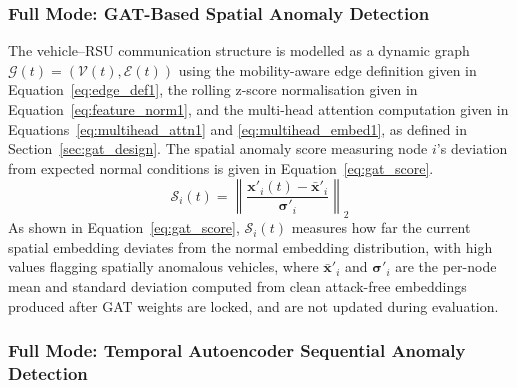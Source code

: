 \documentclass[12pt, a4paper]{report}
\begin{document}
\subsubsection{Full Mode: GAT-Based Spatial Anomaly Detection}
The vehicle--RSU communication structure is modelled as a dynamic graph
$\mathcal{G}(t) = (\mathcal{V}(t), \mathcal{E}(t))$ using the
mobility-aware edge definition given in Equation~\ref{eq:edge_def1},
the rolling z-score normalisation given in
Equation~\ref{eq:feature_norm1}, and the multi-head attention
computation given in Equations~\ref{eq:multihead_attn1} and
\ref{eq:multihead_embed1}, as defined in
Section~\ref{sec:gat_design}. The spatial anomaly score measuring
node $i$'s deviation from expected normal conditions is given in
Equation~\ref{eq:gat_score}.
\begin{equation}
  \mathcal{S}_i(t) = \left\|
    \frac{\mathbf{x}'_i(t) - \bar{\mathbf{x}}'_i}
         {\boldsymbol{\sigma}'_i}
  \right\|_2
  \label{eq:gat_score}
\end{equation}
As shown in Equation~\ref{eq:gat_score},
$\mathcal{S}_i(t)$ measures how far the current spatial embedding
deviates from the normal embedding distribution, with high values
flagging spatially anomalous vehicles, where $\bar{\mathbf{x}}'_i$
and $\boldsymbol{\sigma}'_i$ are the per-node mean and standard
deviation computed from clean attack-free embeddings produced after
GAT weights are locked, and are not updated during evaluation.

\subsubsection{Full Mode: Temporal Autoencoder Sequential Anomaly Detection}
\end{document}
